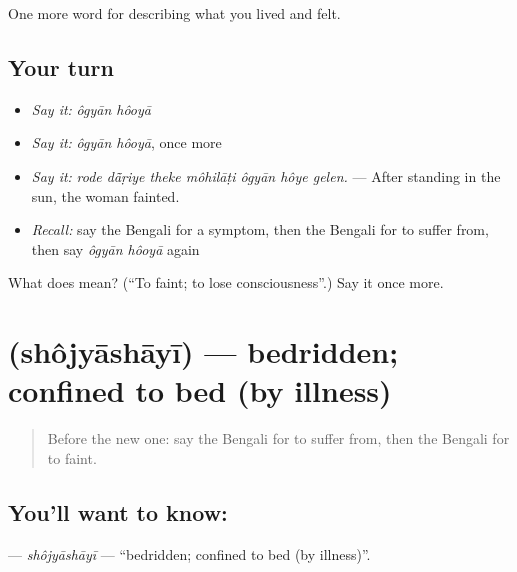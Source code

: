 \begin{grammarlens}[title={What you've built}]
One more word for describing what you lived and felt.
\end{grammarlens}

\subsection*{Your turn}
\begin{itemize}
\raggedright
  \item \emph{Say it:} \emph{ôgyān hôoyā}
  \item \emph{Say it:} \emph{ôgyān hôoyā}, once more
  \item \emph{Say it:} \emph{rode dā̃ṛiye theke môhilāṭi ôgyān hôye gelen.} — After standing in the sun, the woman fainted.
  \item \emph{Recall:} say the Bengali for a symptom, then the Bengali for to suffer from, then say \emph{ôgyān hôoyā} again
\end{itemize}

\begin{tcolorbox}[breakable,colback=teal!4,colframe=teal!35!black,title={Before you move on}]
What does   mean? (\textquotedblleft{}To faint; to lose consciousness\textquotedblright{}.) Say it once more.
\end{tcolorbox}
\section[\texorpdfstring{\bn{শয্যাশায়ী} (shôjyāshāyī)}{শয্যাশায়ী (shôjyāshāyī)}]{ (shôjyāshāyī) — bedridden; confined to bed (by illness)}

\label{lesson:BN-C471-shojyashayi}



\begin{quote}
Before the new one: say the Bengali for to suffer from, then the Bengali for to faint.
\end{quote}

\subsection*{You'll want to know: }
\textbf{} — \emph{shôjyāshāyī} — \textquotedblleft{}bedridden; confined to bed (by illness)\textquotedblright{}.

\begin{quote}
      
\end{quote}

